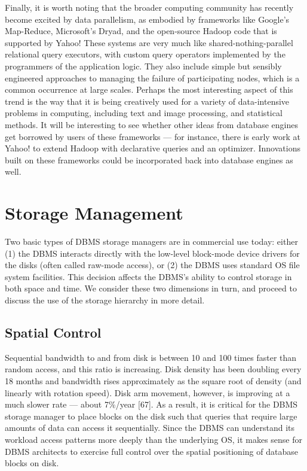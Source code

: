 \documentclass[a4paper,11pt,twoside,openright]{book}
\begin{document}
Finally, it is worth noting that the broader computing community has
recently become excited by data parallelism, as embodied by frameworks
like Google's Map-Reduce, Microsoft's Dryad, and the open-source Hadoop
code that is supported by Yahoo! These systems are very much like
shared-nothing-parallel relational query executors, with custom query
operators implemented by the programmers of the application logic. They
also include simple but sensibly engineered approaches to managing the
failure of participating nodes, which is a common occurrence at large
scales. Perhaps the most interesting aspect of this trend is the way
that it is being creatively used for a variety of data-intensive
problems in computing, including text and image processing, and
statistical methods. It will be interesting to see whether other ideas
from database engines get borrowed by users of these frameworks --- for
instance, there is early work at Yahoo! to extend Hadoop with
declarative queries and an optimizer. Innovations built on these
frameworks could be incorporated back into database engines as well.

\hypertarget{storage-management}{%
\chapter{Storage Management}\label{storage-management}}

Two basic types of DBMS storage managers are in commercial use today:
either (1) the DBMS interacts directly with the low-level block-mode
device drivers for the disks (often called raw-mode access), or (2) the
DBMS uses standard OS file system facilities. This decision affects the
DBMS's ability to control storage in both space and time. We consider
these two dimensions in turn, and proceed to discuss the use of the
storage hierarchy in more detail.

\hypertarget{spatial-control}{%
\section{Spatial Control}\label{spatial-control}}

Sequential bandwidth to and from disk is between 10 and 100 times faster
than random access, and this ratio is increasing. Disk density has been
doubling every 18 months and bandwidth rises approximately as the square
root of density (and linearly with rotation speed). Disk arm movement,
however, is improving at a much slower rate --- about 7\%/year {[}67{]}.
As a result, it is critical for the DBMS storage manager to place blocks
on the disk such that queries that require large amounts of data can
access it sequentially. Since the DBMS can understand its workload
access patterns more deeply than the underlying OS, it makes sense for
DBMS architects to exercise full control over the spatial positioning of
database blocks on disk.
\end{document}
